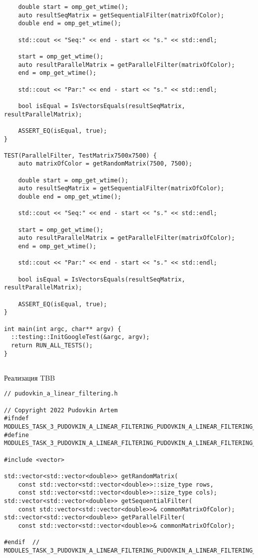 \documentclass{report}
\begin{document}
\begin{lstlisting}
    double start = omp_get_wtime();
    auto resultSeqMatrix = getSequentialFilter(matrixOfColor);
    double end = omp_get_wtime();

    std::cout << "Seq:" << end - start << "s." << std::endl;

    start = omp_get_wtime();
    auto resultParallelMatrix = getParallelFilter(matrixOfColor);
    end = omp_get_wtime();

    std::cout << "Par:" << end - start << "s." << std::endl;

    bool isEqual = IsVectorsEquals(resultSeqMatrix, resultParallelMatrix);

    ASSERT_EQ(isEqual, true);
}

TEST(ParallelFilter, TestMatrix7500x7500) {
    auto matrixOfColor = getRandomMatrix(7500, 7500);

    double start = omp_get_wtime();
    auto resultSeqMatrix = getSequentialFilter(matrixOfColor);
    double end = omp_get_wtime();

    std::cout << "Seq:" << end - start << "s." << std::endl;

    start = omp_get_wtime();
    auto resultParallelMatrix = getParallelFilter(matrixOfColor);
    end = omp_get_wtime();

    std::cout << "Par:" << end - start << "s." << std::endl;

    bool isEqual = IsVectorsEquals(resultSeqMatrix, resultParallelMatrix);

    ASSERT_EQ(isEqual, true);
}

int main(int argc, char** argv) {
  ::testing::InitGoogleTest(&argc, argv);
  return RUN_ALL_TESTS();
}


\end{lstlisting}
Реализация TBB
\begin{lstlisting}
// pudovkin_a_linear_filtering.h

// Copyright 2022 Pudovkin Artem
#ifndef MODULES_TASK_3_PUDOVKIN_A_LINEAR_FILTERING_PUDOVKIN_A_LINEAR_FILTERING_H_
#define MODULES_TASK_3_PUDOVKIN_A_LINEAR_FILTERING_PUDOVKIN_A_LINEAR_FILTERING_H_

#include <vector>

std::vector<std::vector<double>> getRandomMatrix(
    const std::vector<std::vector<double>>::size_type rows,
    const std::vector<std::vector<double>>::size_type cols);
std::vector<std::vector<double>> getSequentialFilter(
    const std::vector<std::vector<double>>& commonMatrixOfColor);
std::vector<std::vector<double>> getParallelFilter(
    const std::vector<std::vector<double>>& commonMatrixOfColor);

#endif  // MODULES_TASK_3_PUDOVKIN_A_LINEAR_FILTERING_PUDOVKIN_A_LINEAR_FILTERING_H_

\end{lstlisting}
\end{document}
